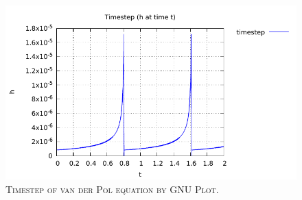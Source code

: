 \documentclass[a4paper,oneside]{book}
\numberwithin{equation}{chapter}
\begin{document}
\begin{figure}[H]
\centering
\includegraphics[scale=1.1]{vdp_ts}
\caption{\textsc{Timestep of van der Pol equation by GNU Plot.}}
\end{figure}
\end{document}
